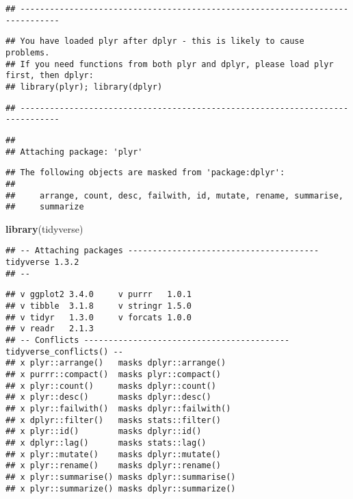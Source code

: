\documentclass[]{book}
\newenvironment{Shaded}{\begin{snugshade}}{\end{snugshade}}
\newcommand{\KeywordTok}[1]{\textcolor[rgb]{0.13,0.29,0.53}{\textbf{#1}}}
\newcommand{\NormalTok}[1]{#1}
\begin{document}
\begin{verbatim}
## ------------------------------------------------------------------------------
\end{verbatim}

\begin{verbatim}
## You have loaded plyr after dplyr - this is likely to cause problems.
## If you need functions from both plyr and dplyr, please load plyr first, then dplyr:
## library(plyr); library(dplyr)
\end{verbatim}

\begin{verbatim}
## ------------------------------------------------------------------------------
\end{verbatim}

\begin{verbatim}
## 
## Attaching package: 'plyr'
\end{verbatim}

\begin{verbatim}
## The following objects are masked from 'package:dplyr':
## 
##     arrange, count, desc, failwith, id, mutate, rename, summarise,
##     summarize
\end{verbatim}

\begin{Shaded}
\begin{Highlighting}[]
\KeywordTok{library}\NormalTok{(tidyverse)}
\end{Highlighting}
\end{Shaded}

\begin{verbatim}
## -- Attaching packages --------------------------------------- tidyverse 1.3.2
## --
\end{verbatim}

\begin{verbatim}
## v ggplot2 3.4.0     v purrr   1.0.1
## v tibble  3.1.8     v stringr 1.5.0
## v tidyr   1.3.0     v forcats 1.0.0
## v readr   2.1.3     
## -- Conflicts ------------------------------------------ tidyverse_conflicts() --
## x plyr::arrange()   masks dplyr::arrange()
## x purrr::compact()  masks plyr::compact()
## x plyr::count()     masks dplyr::count()
## x plyr::desc()      masks dplyr::desc()
## x plyr::failwith()  masks dplyr::failwith()
## x dplyr::filter()   masks stats::filter()
## x plyr::id()        masks dplyr::id()
## x dplyr::lag()      masks stats::lag()
## x plyr::mutate()    masks dplyr::mutate()
## x plyr::rename()    masks dplyr::rename()
## x plyr::summarise() masks dplyr::summarise()
## x plyr::summarize() masks dplyr::summarize()
\end{verbatim}
\end{document}
